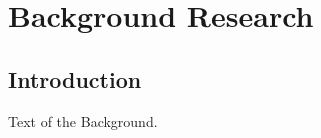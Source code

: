 
\chapter{Background Research}

\label{ch:background}

\section{Introduction}

Text of the Background.
